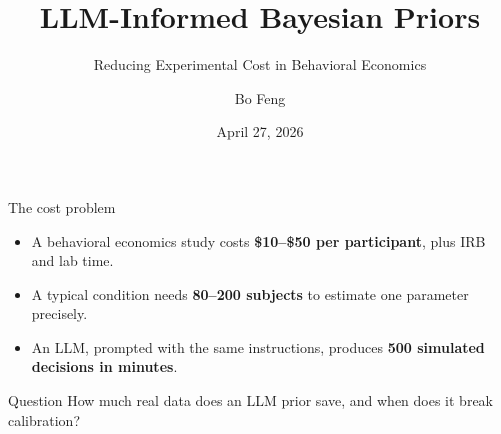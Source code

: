 \documentclass[10pt, aspectratio=169]{beamer}
\title{LLM-Informed Bayesian Priors}
\subtitle{Reducing Experimental Cost in Behavioral Economics}
\author{Bo Feng}
\institute{CSE 8803 IUQ \quad Spring 2026 \quad Georgia Tech}
\date{April 27, 2026}
\begin{document}
\maketitle

\begin{frame}{The cost problem}
\begin{itemize}
  \item A behavioral economics study costs \textbf{\$10--\$50 per participant}, plus IRB and lab time.
  \item A typical condition needs \textbf{80--200 subjects} to estimate one parameter precisely.
  \item An LLM, prompted with the same instructions, produces \textbf{500 simulated decisions in minutes}.
\end{itemize}
\vspace{1em}
\begin{block}{Question}
  How much real data does an LLM prior save, and when does it break calibration?
\end{block}
\end{frame}
\end{document}
